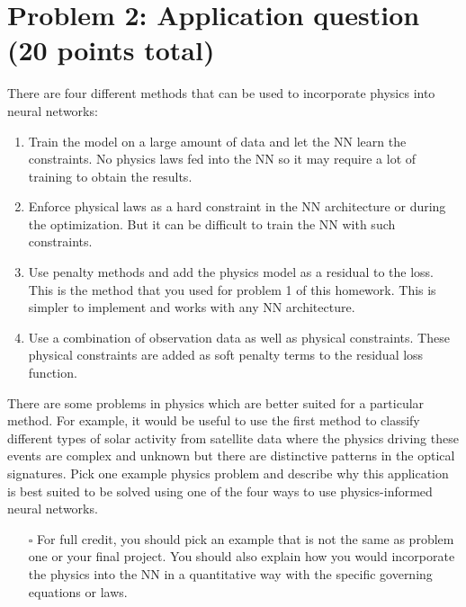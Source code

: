 \documentclass{article}
\begin{document}
\section*{Problem 2: Application question (20 points total)}
There are four different methods that can be used to incorporate physics into neural networks:
\begin{enumerate}
    \item Train the model on a large amount of data and let the NN learn the constraints. No physics laws fed into the NN so it may require a lot of training to obtain the results.
    \item Enforce physical laws as a hard constraint in the NN architecture or during the optimization. But it can be difficult to train the NN with such constraints.
    \item Use penalty methods and add the physics model as a residual to the loss. This is the method that you used for problem 1 of this homework. This is simpler to implement and works with any NN architecture.
    \item Use a combination of observation data as well as physical constraints. These physical constraints are added as soft penalty terms to the residual loss function.
\end{enumerate}
There are some problems in physics which are better suited for a particular method. For example, it would be useful to use the first method to classify different types of solar activity from satellite data where the physics driving these events are complex and unknown but there are distinctive patterns in the optical signatures. Pick one example physics problem and describe why this application is best suited to be solved using one of the four ways to use physics-informed neural networks.
\begin{itemize}
    \item[$\square$] For full credit, you should pick an example that is not the same as problem one or your final project. You should also explain how you would incorporate the physics into the NN in a quantitative way with the specific governing equations or laws.
\end{itemize}
\end{document}
